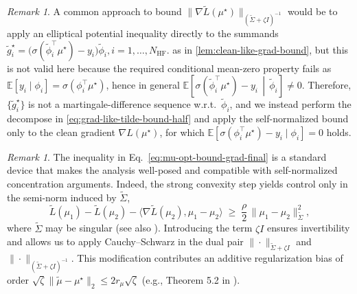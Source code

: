 \documentclass[10pt]{article} %
\theoremstyle{plain}
\theoremstyle{definition}
\theoremstyle{remark}
\newtheorem{remark}[theorem]{Remark}
\newcommand{\bE}{\mathbb{E}}
\begin{document}
\begin{remark}\label{remark:why-not-exact-cov}
A common approach to bound $\|\nabla \tilde L(\mu^\star)\|_{(\tilde\Sigma+\zeta I)^{-1}}$ would be to apply an elliptical potential inequality directly to the summands \(
\tilde g_i^\star
=\bigl(\sigma(\tilde\phi_i^\top\mu^\star)-y_i\bigr)\tilde\phi_i, i=1,\dots,N_{\mathrm{HF}}.
\) as in \ref{lem:clean-like-grad-bound}, but this is not valid here because the required conditional mean-zero property fails as
$\bE[y_i\mid \phi_i]=\sigma(\phi_i^\top\mu^\star)$, hence in general \(
\bE\!\left[\sigma(\tilde\phi_i^\top\mu^\star)-y_i \,\middle|\, \tilde\phi_i\right]\neq 0.
\)
Therefore, $\{\tilde g_i^\star\}$ is not a martingale-difference sequence w.r.t.\ $\tilde\phi_i$, and we instead perform the decompose in \ref{eq:grad-like-tilde-bound-half}
and apply the self-normalized bound only to the clean gradient $\nabla L(\mu^\star)$, for which
$\bE[\sigma(\phi_i^\top\mu^\star)-y_i\mid \phi_i]=0$ holds.
\end{remark}




\medskip

\begin{remark}\label{rem:norm-change-justification}
The inequality in Eq.~\ref{eq:mu-opt-bound-grad-final} is a standard device that makes the analysis well-posed and compatible with self-normalized concentration arguments. 
Indeed, the strong convexity step yields control only in the semi-norm induced by $\tilde\Sigma$,
\[
\tilde L(\mu_1)-\tilde L(\mu_2)-\langle \nabla \tilde L(\mu_2),\mu_1-\mu_2\rangle \;\ge\; \frac{\rho}{2}\,\|\mu_1-\mu_2\|_{\tilde\Sigma}^2,
\]
where $\tilde\Sigma$ may be singular (see also \citet{Agarwal2020,Du2024Exploration-DrivenUtilization,ZhuPrincipledComparisons,NIPS2011_e1d5be1c}). 
Introducing the term $\zeta I$ ensures invertibility and allows us to apply Cauchy--Schwarz in the dual pair
$\|\cdot\|_{\tilde\Sigma+\zeta I}$ and $\|\cdot\|_{(\tilde\Sigma+\zeta I)^{-1}}$. 
This modification contributes an additive regularization bias of order $\sqrt{\zeta}\|\tilde\mu-\mu^\star\|_2\le 2r_\mu\sqrt{\zeta}$ (e.g., Theorem 5.2 in \citet{ZhuPrincipledComparisons}).
\end{remark}
\end{document}

